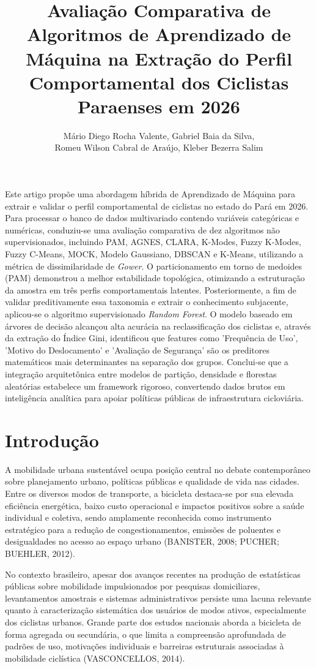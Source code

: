 \documentclass[12pt]{article}
\title{Avaliação Comparativa de Algoritmos de Aprendizado de Máquina na Extração do Perfil Comportamental dos Ciclistas Paraenses em 2026}
\author{
Mário Diego Rocha Valente\inst{1}\orcidlink{0000-0001-7262-3336},
Gabriel Baia da Silva\inst{1}\orcidlink{0009-0003-0404-5046}, \\
Romeu Wilson Cabral de Araújo\inst{2}\orcidlink{0009-0002-3796-9854},
Kleber Bezerra Salim\inst{3}\orcidlink{0000-0002-8566-3238}
}
\begin{document}
\pagestyle{empty}
\maketitle

\begin{resumo} 
 Este artigo propõe uma abordagem híbrida de Aprendizado de Máquina para extrair e validar o perfil comportamental de ciclistas no estado do Pará em 2026. Para processar o banco de dados multivariado contendo variáveis categóricas e numéricas, conduziu-se uma avaliação comparativa de dez algoritmos não supervisionados, incluindo PAM, AGNES, CLARA, K-Modes, Fuzzy K-Modes, Fuzzy C-Means, MOCK, Modelo Gaussiano, DBSCAN e K-Means, utilizando a métrica de dissimilaridade de \textit{Gower}. O particionamento em torno de medoides (PAM) demonstrou a melhor estabilidade topológica, otimizando a estruturação da amostra em três perfis comportamentais latentes. Posteriormente, a fim de validar preditivamente essa taxonomia e extrair o conhecimento subjacente, aplicou-se o algoritmo supervisionado \textit{Random Forest}. O modelo baseado em árvores de decisão alcançou alta acurácia na reclassificação dos ciclistas e, através da extração do Índice Gini, identificou que features como 'Frequência de Uso', 'Motivo do Deslocamento' e 'Avaliação de Segurança' são os preditores matemáticos mais determinantes na separação dos grupos. Conclui-se que a integração arquitetônica entre modelos de partição, densidade e florestas aleatórias estabelece um framework rigoroso, convertendo dados brutos em inteligência analítica para apoiar políticas públicas de infraestrutura cicloviária.
\end{resumo}

\section{Introdução}

A mobilidade urbana sustentável ocupa posição central no debate contemporâneo sobre planejamento urbano, políticas públicas e qualidade de vida nas cidades. Entre os diversos modos de transporte, a bicicleta destaca-se por sua elevada eficiência energética, baixo custo operacional e impactos positivos sobre a saúde individual e coletiva, sendo amplamente reconhecida como instrumento estratégico para a redução de congestionamentos, emissões de poluentes e desigualdades no acesso ao espaço urbano (BANISTER, 2008; PUCHER; BUEHLER, 2012).

No contexto brasileiro, apesar dos avanços recentes na produção de estatísticas públicas sobre mobilidade impulsionados por pesquisas domiciliares, levantamentos amostrais e sistemas administrativos persiste uma lacuna relevante quanto à caracterização sistemática dos usuários de modos ativos, especialmente dos ciclistas urbanos. Grande parte dos estudos nacionais aborda a bicicleta de forma agregada ou secundária, o que limita a compreensão aprofundada de padrões de uso, motivações individuais e barreiras estruturais associadas à mobilidade ciclística (VASCONCELLOS, 2014).
\end{document}
